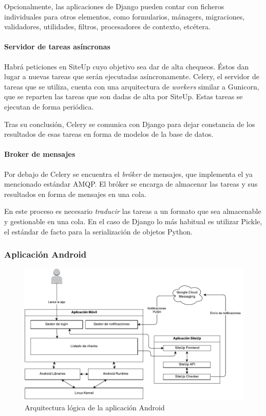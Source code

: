 Opcionalmente, las aplicaciones de Django pueden contar con ficheros
individuales para otros elementos, como formularios, mánagers, migraciones,
validadores, utilidades, filtros, procesadores de contexto, etcétera.

\paragraph{Servidor de tareas asíncronas}

Habrá peticiones en SiteUp cuyo objetivo sea dar de alta chequeos. Éstos dan
lugar a nuevas tareas que serán ejecutadas asíncronamente. Celery, el servidor
de tareas que se utiliza, cuenta con una arquitectura de \textit{workers}
similar a Gunicorn, que se reparten las tareas que son dadas de alta por
SiteUp. Estas tareas se ejecutan de forma periódica. 

Tras su conclusión, Celery se comunica con Django para dejar constancia de los
resultados de esas tareas en forma de modelos de la base de datos.

\paragraph{Broker de mensajes}

Por debajo de Celery se encuentra el \textit{bróker} de mensajes, que implementa
el ya mencionado estándar \ac{AMQP}. El bróker se encarga de almacenar las
tareas y sus resultados en forma de mensajes en una cola. 

En este proceso es necesario \textit{traducir} las tareas a un formato que sea
almacenable y gestionable en una cola. En el caso de Django lo más habitual es
utilizar Pickle, el estándar de facto para la serialización de objetos Python.

\subsubsection{Aplicación Android}
\label{subsec:arquitectura-logica-android}


\begin{figure}[hbtp]
  \centering
  \includegraphics[width=\textwidth]{5_diseno/diagrama_arquitectura_logica_android}
  \caption{Arquitectura lógica de la aplicación Android}
  \label{fig:arquitectura-logica-android}
\end{figure}

